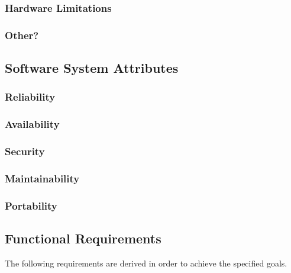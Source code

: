 \subsubsection{Hardware Limitations}
\subsubsection{Other?}

\subsection{Software System Attributes}

\subsubsection{Reliability}
\subsubsection{Availability}
\subsubsection{Security}
\subsubsection{Maintainability}
\subsubsection{Portability}





\subsection{Functional Requirements}
The following requirements are derived in order to achieve the specified goals.
